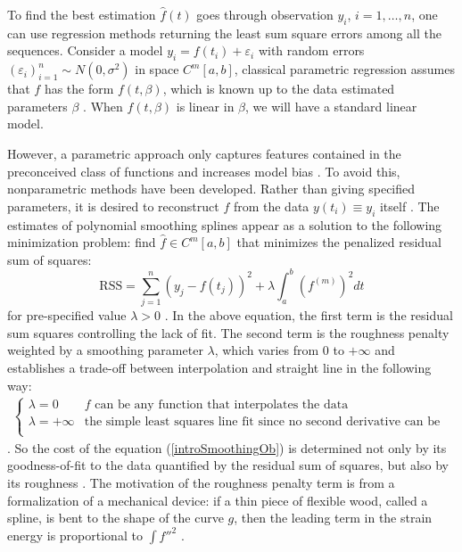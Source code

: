 To find the best estimation $\hat{f}(t)$ goes through observation $y_i$, $i=1,\ldots,n$, one can use regression methods returning the least sum square errors among all the sequences. Consider a model $y_i=f(t_i)+\varepsilon_i$ with random errors $(\varepsilon_i)_{i=1}^n \sim N(0,\sigma^2)$ in space $\mathit{C}^m[a,b]$, classical parametric regression assumes that $f$ has the form $f(t,\beta)$, which is known up to the data estimated parameters $\beta$ \cite{kim2004smoothing}. When $f(t,\beta)$ is linear in $\beta$, we will have a standard linear model. 


However, a parametric approach only captures features contained in the preconceived class of functions and increases model bias \cite{yao2005functional}. To avoid this, nonparametric methods have been developed. Rather than giving specified parameters, it is desired to reconstruct $f$ from the data $y(t_i)\equiv y_i$ itself  \cite{craven1978smoothing}. The estimates of polynomial smoothing splines appear as a solution to the following minimization problem: find $\hat{f} \in \mathit{C}^m[a,b]$ that minimizes the penalized residual sum of squares: 
\begin{equation}\label{introSmoothingOb}
\mbox{RSS}=\sum_{j=1}^{n}\left(  y_j-f(t_j)\right) ^2+\lambda\int_a^b (f^{(m)})^2dt
\end{equation}
for pre-specified value $\lambda>0$ \cite{aydin2012smoothing}. In the above equation, the first term is the residual sum squares controlling the lack of fit. The second term is the roughness penalty weighted by a smoothing parameter $\lambda$, which varies from $0$ to $+\infty$ and establishes a trade-off between interpolation and straight line in the following way: 
\begin{align*}
\begin{cases}
\lambda = 0  & \mbox{$f$ can be any function that interpolates the data}\\
\lambda = +\infty & \mbox{the simple least squares line fit since no second derivative can be tolerated}\\
\end{cases}
\end{align*}\cite{esl2009}. 
So the cost of the equation (\ref{introSmoothingOb}) is determined not only by its goodness-of-fit to the data quantified by the residual sum of squares, but also by its roughness \cite{schwarz2012geodesy}. The motivation of the roughness penalty term is from a formalization of a mechanical device: if a thin piece of flexible wood, called a spline, is bent to the shape of the curve $g$, then the leading term in the strain energy is proportional to $\int f''^2$ \cite{green1993nonparametric}. 




